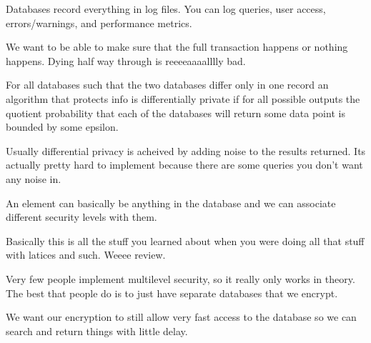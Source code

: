 \documentclass{article}
\begin{document}



Databases record everything in log files. You can log queries, user access, errors/warnings, and performance metrics. 


We want to be able to make sure that the full transaction happens or nothing happens. Dying half way through is reeeeaaaalllly bad.





For all databases such that the two databases differ only in one record an algorithm that protects info is differentially private if for all possible outputs the quotient probability that each of the databases will return some data point is bounded by some epsilon. 

Usually differential privacy is acheived by adding noise to the results returned. Its actually pretty hard to implement because there are some queries you don't want any noise in.




An element can basically be anything in the database and we can associate different security levels with them. 


Basically this is all the stuff you learned about when you were doing all that stuff with latices and such. Weeee review.



Very few people implement multilevel security, so it really only works in theory. The best that people do is to just have separate databases that we encrypt. 


We want our encryption to still allow very fast access to the database so we can search and return things with little delay.










\end{document}
